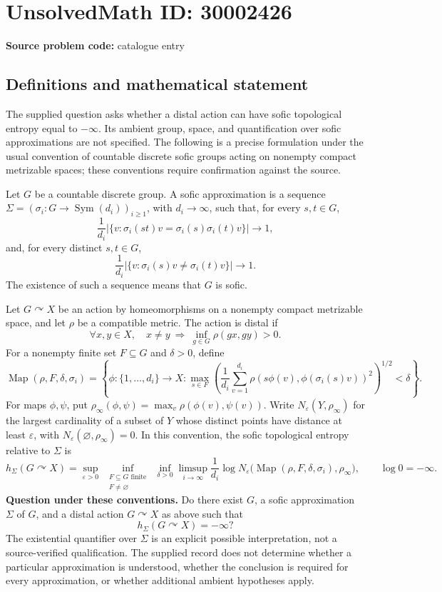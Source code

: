 \documentclass[11pt]{article}
\newcommand{\F}{\mathbb{F}}
\begin{document}
\section*{UnsolvedMath ID: 30002426}
\textbf{Source problem code:} catalogue entry
\subsection{Definitions and mathematical statement}
The supplied question asks whether a distal action can have sofic topological entropy equal to \(-\infty\). Its ambient group, space, and quantification over sofic approximations are not specified. The following is a precise formulation under the usual convention of countable discrete sofic groups acting on nonempty compact metrizable spaces; these conventions require confirmation against the source.

Let \(G\) be a countable discrete group. A sofic approximation is a sequence \(\Sigma=(\sigma_i\colon G\to\operatorname{Sym}(d_i))_{i\geq1}\), with \(d_i\to\infty\), such that, for every \(s,t\in G\),
\[
\frac{1}{d_i}\bigl|\{v:\sigma_i(st)v=\sigma_i(s)\sigma_i(t)v\}\bigr|\longrightarrow1,
\]
and, for every distinct \(s,t\in G\),
\[
\frac{1}{d_i}\bigl|\{v:\sigma_i(s)v\ne\sigma_i(t)v\}\bigr|\longrightarrow1.
\]
The existence of such a sequence means that \(G\) is sofic.

Let \(G\curvearrowright X\) be an action by homeomorphisms on a nonempty compact metrizable space, and let \(\rho\) be a compatible metric. The action is distal if
\[
\forall x,y\in X,\quad x\ne y\ \Longrightarrow\ \inf_{g\in G}\rho(gx,gy)>0.
\]
For a nonempty finite set \(F\subseteq G\) and \(\delta>0\), define
\[
\operatorname{Map}(\rho,F,\delta,\sigma_i)
=\left\{\phi\colon\{1,\ldots,d_i\}\to X:
\max_{s\in F}\left(\frac1{d_i}\sum_{v=1}^{d_i}
\rho(s\phi(v),\phi(\sigma_i(s)v))^2\right)^{1/2}<\delta\right\}.
\]
For maps \(\phi,\psi\), put \(\rho_\infty(\phi,\psi)=\max_v\rho(\phi(v),\psi(v))\). Write \(N_\varepsilon(Y,\rho_\infty)\) for the largest cardinality of a subset of \(Y\) whose distinct points have distance at least \(\varepsilon\), with \(N_\varepsilon(\varnothing,\rho_\infty)=0\). In this convention, the sofic topological entropy relative to \(\Sigma\) is
\[
h_\Sigma(G\curvearrowright X)
=\sup_{\varepsilon>0}\ \inf_{\substack{F\subseteq G\text{ finite}\\F\ne\varnothing}}\ \inf_{\delta>0}
\limsup_{i\to\infty}\frac1{d_i}\log N_\varepsilon\bigl(\operatorname{Map}(\rho,F,\delta,\sigma_i),\rho_\infty\bigr),
\qquad \log0=-\infty.
\]
\textbf{Question under these conventions.} Do there exist \(G\), a sofic approximation \(\Sigma\) of \(G\), and a distal action \(G\curvearrowright X\) as above such that
\[
h_\Sigma(G\curvearrowright X)=-\infty?
\]
The existential quantifier over \(\Sigma\) is an explicit possible interpretation, not a source-verified qualification. The supplied record does not determine whether a particular approximation is understood, whether the conclusion is required for every approximation, or whether additional ambient hypotheses apply.
\end{document}
